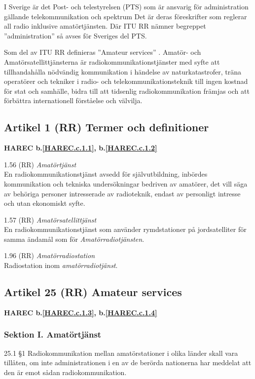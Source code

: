 I Sverige är det Post- och telestyrelsen (PTS) som är ansvarig för
administration gällande telekommunikation och spektrum Det är deras
föreskrifter som reglerar all radio inklusive amatörtjänsten.
Där ITU RR nämner begreppet ''administration'' så avses för Sveriges del PTS.

Som del av ITU RR definieras ''Amateur services'' \cite[Article 25]{ITU-RR}.
Amatör- och Amatörsatellittjänsterna är radiokommunikationstjänster
med syfte att tillhandahålla nödvändig kommunikation i händelse av
naturkatastrofer, träna operatörer och tekniker i radio- och
telekommunikationsteknik till ingen kostnad för stat och samhälle,
bidra till att tidsenlig radiokommunikation främjas och att förbättra
internationell förståelse och välvilja.

\subsection{Artikel 1 (RR) Termer och definitioner}
\textbf{
HAREC b.\ref{HAREC.c.1.1}\label{myHAREC.c.1.1},
 b.\ref{HAREC.c.1.2}\label{myHAREC.c.1.2}
}

1.56 (RR) \emph{Amatörtjänst} \cite[1.56]{ITU-RR}\\
En radiokommunikationstjänst avsedd för självutbildning, inbördes
kommunikation och tekniska undersökningar bedriven av amatörer, det
vill säga av behöriga personer intresserade av radioteknik,
endast av personligt intresse och utan ekonomiskt syfte.

1.57 (RR) \emph{Amatörsatellittjänst} \cite[1.57]{ITU-RR}\\
En radiokommunikationstjänst som använder rymdstationer på
jordsatelliter för samma ändamål som för \emph{Amatörradiotjänsten}.

1.96 (RR) \emph{Amatörradiostation} \cite[1.96]{ITU-RR}\\
Radiostation inom \emph{amatörradiotjänst}.

\subsection{Artikel 25 (RR) Amateur services}
\textbf{
HAREC b.\ref{HAREC.c.1.3}\label{myHAREC.c.1.3},
 b.\ref{HAREC.c.1.4}\label{myHAREC.c.1.4}
}

\subsubsection{Sektion I. Amatörtjänst}
25.1 \S1 Radiokommunikation mellan amatörstationer i olika länder
skall vara tillåten, om inte administrationen i en av de berörda
nationerna har meddelat att den är emot sådan radiokommunikation.
\cite[25.1]{ITU-RR}

